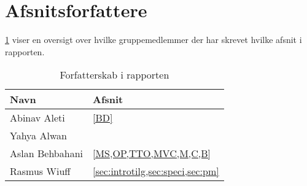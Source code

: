 \appendix
\appendixpage
\addappheadtotoc
\section{Afsnitsforfattere}\label{sec:arbejde}
\cref{tbl:arbejde} viser en oversigt over hvilke gruppemedlemmer der har skrevet hvilke afsnit i rapporten.
\begin{table}[H]
    \centering
    \caption{Forfatterskab i rapporten}\label{tbl:arbejde}
    \begin{tabular}{p{}p{}}
        \toprule
        Navn            & Afsnit                                \\
        \midrule
        Abinav Aleti    &   \cref{BD}                            \\
        \midrule
        Yahya Alwan     &                                       \\
        \midrule
        Aslan Behbahani & \cref{MS,OP,TTO,MVC,M,C,B}                  \\
        \midrule
        Rasmus Wiuff    & \cref{sec:introtilg,sec:speci,sec:pm} \\
        \bottomrule
    \end{tabular}
\end{table}